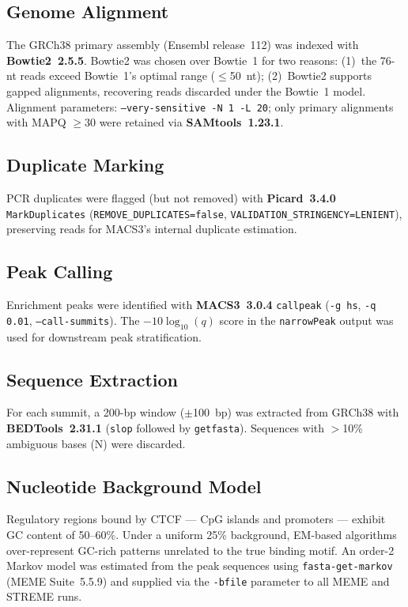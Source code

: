 \documentclass[12pt]{article}
\begin{document}
\subsection{Genome Alignment}

The GRCh38 primary assembly (Ensembl release~112) was indexed with
\textbf{Bowtie2~2.5.5}. Bowtie2 was chosen over Bowtie~1 for two reasons:
(1)~the 76-nt reads exceed Bowtie~1's optimal range ($\leq$50~nt); (2)~Bowtie2
supports gapped alignments, recovering reads discarded under the Bowtie~1 model.
Alignment parameters: \texttt{--very-sensitive -N~1 -L~20}; only primary
alignments with MAPQ $\geq 30$ were retained via \textbf{SAMtools~1.23.1}.

\subsection{Duplicate Marking}

PCR duplicates were flagged (but not removed) with \textbf{Picard~3.4.0}
\texttt{MarkDuplicates} (\texttt{REMOVE\_DUPLICATES=false},
\texttt{VALIDATION\_STRINGENCY=LENIENT}), preserving reads for MACS3's
internal duplicate estimation.

\subsection{Peak Calling}

Enrichment peaks were identified with \textbf{MACS3~3.0.4} \texttt{callpeak}
(\texttt{-g hs}, \texttt{-q 0.01}, \texttt{--call-summits}). The
$-10\log_{10}(q)$ score in the \texttt{narrowPeak} output was used for
downstream peak stratification.

\subsection{Sequence Extraction}

For each summit, a 200-bp window ($\pm$100~bp) was extracted from GRCh38 with
\textbf{BEDTools~2.31.1} (\texttt{slop} followed by \texttt{getfasta}).
Sequences with $>$10\% ambiguous bases (N) were discarded.

\subsection{Nucleotide Background Model}

Regulatory regions bound by CTCF --- CpG islands and promoters --- exhibit GC
content of 50--60\%. Under a uniform 25\% background, EM-based algorithms
over-represent GC-rich patterns unrelated to the true binding motif. An order-2
Markov model was estimated from the peak sequences using \texttt{fasta-get-markov}
(MEME Suite~5.5.9) and supplied via the \texttt{-bfile} parameter to all MEME
and STREME runs.
\end{document}
